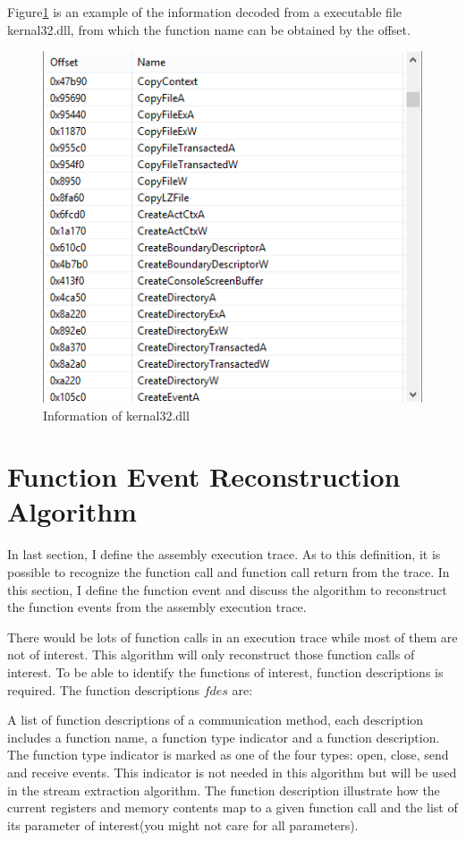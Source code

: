 Figure\ref{executable} is an example of the information decoded from a executable file kernal32.dll, from which the function name can be obtained by the offset.

\begin{figure}[H]
\centerline{\includegraphics{Figures/executable}}
\caption{Information of kernal32.dll}
\label{executable}
\end{figure}

\section{Function Event Reconstruction Algorithm}
In last section, I define the assembly execution trace. As to this definition, it is possible to recognize the function call and function call return from the trace.  In this section, I define the function event and discuss the algorithm to reconstruct the function events from the assembly execution trace. 


There would be lots of function calls in an execution trace while most of them are not of interest. This algorithm will only reconstruct those function calls of interest. To be able to identify the functions of interest, function descriptions is required. The function descriptions $fdes$ are:

A list of function descriptions of a communication method, each description includes a function name, a function type indicator and a function description. The function type indicator is marked as one of the four types: open, close, send and receive events. This indicator is not needed in this algorithm but will be used in the stream extraction algorithm. The function description illustrate how the current registers and memory contents map to a given function call and the list of its parameter of interest(you might not care for all parameters). 

